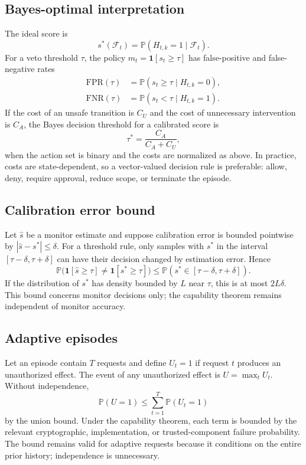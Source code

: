 \documentclass[11pt]{article}
\newcommand{\Prob}{\mathbb{P}}
\newcommand{\1}{\mathbf{1}}
\begin{document}
\subsection{Bayes-optimal interpretation}
The ideal score is
\begin{equation}
 s^*(\mathcal{F}_t)=\Prob(H_{t,k}=1\mid\mathcal{F}_t).
\end{equation}
For a veto threshold $\tau$, the policy $m_t=\1[s_t\ge\tau]$ has false-positive and false-negative rates
\begin{align}
 \mathrm{FPR}(\tau)&=\Prob(s_t\ge\tau\mid H_{t,k}=0),\\
 \mathrm{FNR}(\tau)&=\Prob(s_t<\tau\mid H_{t,k}=1).
\end{align}
If the cost of an unsafe transition is $C_U$ and the cost of unnecessary intervention is $C_A$, the Bayes decision threshold for a calibrated score is
\begin{equation}
 \tau^*=\frac{C_A}{C_A+C_U},
\end{equation}
when the action set is binary and the costs are normalized as above. In practice, costs are state-dependent, so a vector-valued decision rule is preferable: allow, deny, require approval, reduce scope, or terminate the episode.

\subsection{Calibration error bound}
Let $\hat s$ be a monitor estimate and suppose calibration error is bounded pointwise by $|\hat s-s^*|\le\delta$. For a threshold rule, only samples with $s^*$ in the interval $[\tau-\delta,\tau+\delta]$ can have their decision changed by estimation error. Hence
\begin{equation}
 \Prob\bigl(\1[\hat s\ge\tau]\ne\1[s^*\ge\tau]\bigr)
 \le \Prob(s^*\in[\tau-\delta,\tau+\delta]).
\end{equation}
If the distribution of $s^*$ has density bounded by $L$ near $\tau$, this is at most $2L\delta$. This bound concerns monitor decisions only; the capability theorem remains independent of monitor accuracy.

\subsection{Adaptive episodes}
Let an episode contain $T$ requests and define $U_t=1$ if request $t$ produces an unauthorized effect. The event of any unauthorized effect is $U=\max_t U_t$. Without independence,
\begin{equation}
 \Prob(U=1)\le\sum_{t=1}^{T}\Prob(U_t=1)
\end{equation}
by the union bound. Under the capability theorem, each term is bounded by the relevant cryptographic, implementation, or trusted-component failure probability. The bound remains valid for adaptive requests because it conditions on the entire prior history; independence is unnecessary.
\end{document}
